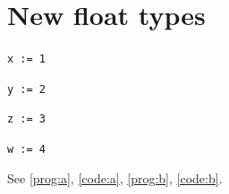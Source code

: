 \documentclass{article}
\begin{document}
\listofprograms
\listofcodes
\section{New float types}
\begin{program}
\centering\texttt{x := 1}
\caption{A program}\label{prog:a}
\end{program}
\begin{code}
\caption{Some code}\label{code:a}
\centering\texttt{y := 2}
\end{code}
\begin{program*}
\centering\texttt{z := 3}
\caption{A double program in one column mode}\label{prog:b}
\end{program*}
\begin{center}
\texttt{w := 4}
\label{code:b}
\end{center}
See \ref{prog:a}, \ref{code:a}, \ref{prog:b}, \ref{code:b}.
\end{document}
